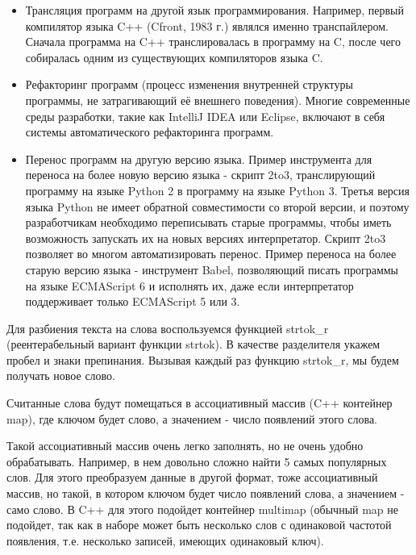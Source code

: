 \begin{itemize}
\item Трансляция программ на другой язык программирования. Например, первый компилятор языка C++ (Cfront, 1983 г.) являлся именно транспайлером. Сначала программа на C++ транслировалась в программу на C, после чего собиралась одним из существующих компиляторов языка C.
\item Рефакторинг программ (процесс изменения внутренней структуры программы, не затрагивающий её внешнего поведения). Многие современные среды разработки, такие как IntelliJ IDEA или Eclipse, включают в себя системы автоматического рефакторинга программ.
\item Перенос программ на другую версию языка. Пример инструмента для переноса на более новую версию языка - скрипт 2to3, транслирующий программу на языке Python 2 в программу на языке Python 3. Третья версия языка Python не имеет обратной совместимости со второй версии, и поэтому разработчикам необходимо переписывать старые программы, чтобы иметь возможность запускать их на новых версиях интерпретатор. Скрипт 2to3 позволяет во многом автоматизировать перенос. Пример переноса на более старую версию языка - инструмент Babel, позволяющий писать программы на языке ECMAScript 6 и исполнять их, даже если интерпретатор поддерживает только ECMAScript 5 или 3.
\end{itemize}

Для разбиения текста на слова воспользуемся функцией strtok\_r (реентерабельный вариант функции strtok). В качестве разделителя укажем пробел и знаки препинания. Вызывая каждый раз функцию strtok\_r, мы будем получать новое слово.

Считанные слова будут помещаться в ассоциативный массив (C++ контейнер map), где ключом будет слово, а значением - число появлений этого слова.

% 

% 

Такой ассоциативный массив очень легко заполнять, но не очень удобно обрабатывать. Например, в нем довольно сложно найти 5 самых популярных слов. Для этого преобразуем данные в другой формат, тоже ассоциативный массив, но такой, в котором ключом будет число появлений слова, а значением - само слово. В C++ для этого подойдет контейнер multimap (обычный map не подойдет, так как в наборе может быть несколько слов с одинаковой частотой появления, т.е. несколько записей, имеющих одинаковый ключ).

